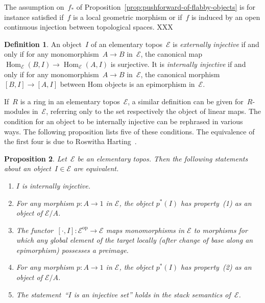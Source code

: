\documentclass[oneside]{amsart}
\theoremstyle{definition}
\newtheorem{defn}{Definition}[section]
\theoremstyle{plain}
\newtheorem{prop}[defn]{Proposition}
\theoremstyle{remark}
\newcommand{\E}{\mathcal{E}}
\newcommand{\op}{\mathrm{op}}
\DeclareMathOperator{\Hom}{Hom}
\renewcommand{\_}{\mathpunct{.}\,}
\begin{document}
The assumption on~$f_*$ of Proposition~\ref{prop:pushforward-of-flabby-objects}
is for instance satisfied if~$f$ is a local geometric morphism or if~$f$ is
induced by an open continuous injection between topological spaces. XXX

\begin{defn}An object~$I$ of an elementary topos~$\E$ is \emph{externally
injective} if and only if for any monomorphism~$A \to B$ in~$\E$, the canonical
map~$\Hom_\E(B,I) \to \Hom_\E(A,I)$ is surjective. It is \emph{internally
injective} if and only if for any monomorphism~$A \to B$ in~$\E$, the canonical
morphism~$[B,I] \to [A,I]$ between Hom objects is an epimorphism in~$\E$.
\end{defn}

If~$R$ is a ring in an elementary topos~$\E$, a similar definition can be given
for~$R$-modules in~$\E$, referring only to the set respectively the object of
linear maps. The condition for an object to be internally injective can be
rephrased in various ways. The following proposition lists five of these
conditions. The equivalence of the first four is due to
Roswitha Harting~\cite{harting:locally-injective}.

\begin{prop}\label{prop:notions-of-internal-injectivity}
Let~$\E$ be an elementary topos. Then the following statements about an
object~$I \in \E$ are equivalent.
\begin{enumerate}
\item[(1)] $I$ is internally injective.
\item[(1')] For any morphism $p : A \to 1$ in $\E$, the object $p^*(I)$ has property~(1)
as an object of $\E/A$.
\item[(2)] The functor~$[\cdot, I] : \E^\op \to \E$ maps monomorphisms in $\E$
to morphisms for which any global element of the target locally (after change of
base along an epimorphism) possesses a preimage.
\item[(2')] For any morphism $p : A \to 1$ in $\E$, the object $p^*(I)$ has property~(2)
as an object of $\E/A$.
\item[(3)] The statement~``$I$ is an injective set'' holds in the stack
semantics of~$\E$.
\end{enumerate}
\end{prop}
\end{document}
